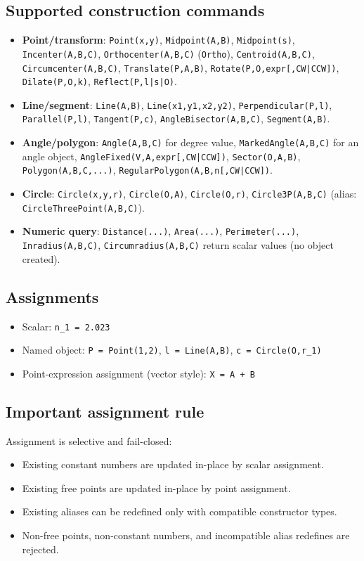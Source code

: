 \documentclass[11pt,a4paper]{article}
\begin{document}
\subsection{Supported construction commands}
\begin{itemize}[leftmargin=1.5em]
  \item \textbf{Point/transform}: \texttt{Point(x,y)}, \texttt{Midpoint(A,B)}, \texttt{Midpoint(s)}, \texttt{Incenter(A,B,C)}, \texttt{Orthocenter(A,B,C)} (\texttt{Ortho}), \texttt{Centroid(A,B,C)}, \texttt{Circumcenter(A,B,C)}, \texttt{Translate(P,A,B)}, \texttt{Rotate(P,O,expr[,CW|CCW])}, \texttt{Dilate(P,O,k)}, \texttt{Reflect(P,l|s|O)}.
  \item \textbf{Line/segment}: \texttt{Line(A,B)}, \texttt{Line(x1,y1,x2,y2)}, \texttt{Perpendicular(P,l)}, \texttt{Parallel(P,l)}, \texttt{Tangent(P,c)}, \texttt{AngleBisector(A,B,C)}, \texttt{Segment(A,B)}.
  \item \textbf{Angle/polygon}: \texttt{Angle(A,B,C)} for degree value, \texttt{MarkedAngle(A,B,C)} for an angle object, \texttt{AngleFixed(V,A,expr[,CW|CCW])}, \texttt{Sector(O,A,B)}, \texttt{Polygon(A,B,C,...)}, \texttt{RegularPolygon(A,B,n[,CW|CCW])}.
  \item \textbf{Circle}: \texttt{Circle(x,y,r)}, \texttt{Circle(O,A)}, \texttt{Circle(O,r)}, \texttt{Circle3P(A,B,C)} (alias: \texttt{CircleThreePoint(A,B,C)}).
  \item \textbf{Numeric query}: \texttt{Distance(...)}, \texttt{Area(...)}, \texttt{Perimeter(...)}, \texttt{Inradius(A,B,C)}, \texttt{Circumradius(A,B,C)} return scalar values (no object created).
\end{itemize}

\subsection{Assignments}
\begin{itemize}[leftmargin=1.5em]
  \item Scalar: \texttt{n\_1 = 2.023}
  \item Named object: \texttt{P = Point(1,2)}, \texttt{l = Line(A,B)}, \texttt{c = Circle(O,r\_1)}
  \item Point-expression assignment (vector style): \texttt{X = A + B}
\end{itemize}

\subsection{Important assignment rule}
Assignment is selective and fail-closed:
\begin{itemize}[leftmargin=1.5em]
  \item Existing constant numbers are updated in-place by scalar assignment.
  \item Existing free points are updated in-place by point assignment.
  \item Existing aliases can be redefined only with compatible constructor types.
  \item Non-free points, non-constant numbers, and incompatible alias redefines are rejected.
\end{itemize}
\end{document}
